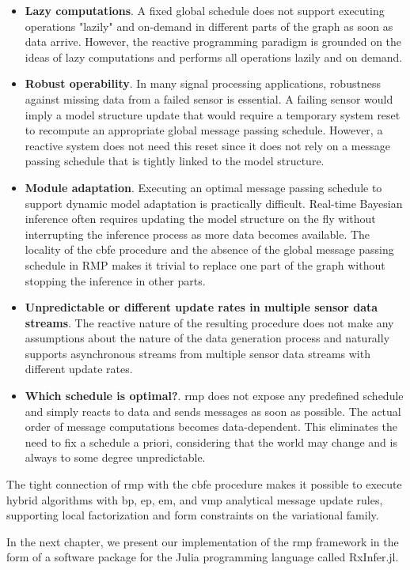 \begin{itemize}
  \item \textbf{Lazy computations}. A fixed global schedule
        does not support executing operations "lazily" and on-demand in different parts of the graph
        as soon as data arrive.
        However, the reactive programming paradigm is grounded on the ideas of lazy computations and
        performs all operations lazily and on demand.

  \item \textbf{Robust operability}.
        In many signal processing applications, robustness against missing data from a failed sensor
        is essential.
        A failing sensor would imply a model structure update that would require a temporary system
        reset to recompute an appropriate global message passing schedule.
        However, a reactive system does not need this reset since it does not rely on a message
        passing schedule that is tightly linked to the model structure.

  \item \textbf{Module adaptation}.
        Executing an optimal message passing schedule to support dynamic model adaptation is
        practically difficult.
        Real-time Bayesian inference often requires updating the model structure on the fly without
        interrupting the inference process as more data becomes available.
        The locality of the \ac{cbfe} procedure and the absence of the global message passing schedule in
        RMP makes it trivial to replace one part of the graph without stopping the inference in other
        parts.

  \item \textbf{Unpredictable or different update rates in multiple sensor data streams}.
        The reactive nature of the resulting procedure does not make any assumptions about the nature
        of the data generation process and naturally supports asynchronous streams from multiple
        sensor data streams with different update rates.

  \item \textbf{Which schedule is optimal?}.
        \Ac{rmp} does not expose any predefined schedule and simply reacts to data and sends messages as
        soon as possible.
        The actual order of message computations becomes data-dependent.
        This eliminates the need to fix a schedule a priori, considering that the world may change and
        is always to some degree unpredictable.

\end{itemize}

The tight connection of \ac{rmp} with the \ac{cbfe} procedure makes it possible to execute hybrid
algorithms with \ac{bp}, \ac{ep}, \ac{em}, and \ac{vmp} analytical message update rules, supporting local
factorization and form constraints on the variational family.

In the next chapter, we present our implementation of the \ac{rmp} framework in the form of a
software package for the Julia programming language called RxInfer.jl.
